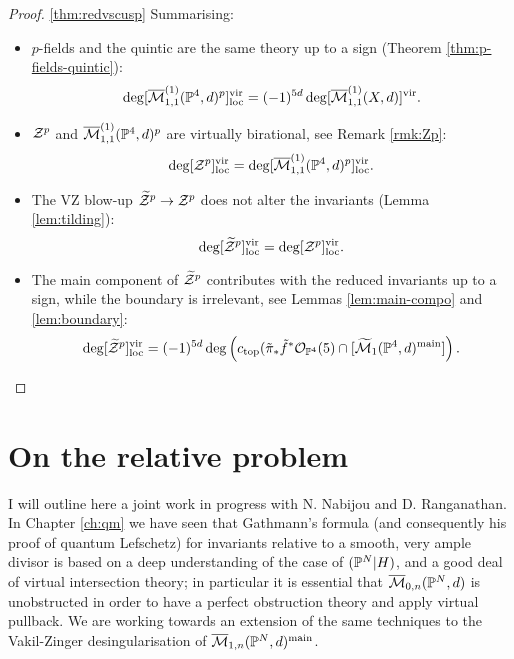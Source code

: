 \begin{proof}\ref{thm:redvscusp}
Summarising:
\begin{itemize}[leftmargin=.5cm]
\item $p$-fields and the quintic are the same theory up to a sign (Theorem \ref{thm:p-fields-quintic}): \[\deg[\overline{\mathcal M}^{(1)}_{1,1}(\mathbb P^4,d)^p]^{\rm{vir}}_{\rm{loc}}= (-1)^{5d}\deg[\overline{\mathcal M}^{(1)}_{1,1}(X,d)]^{\rm{vir}}.\]
\item $\mathcal Z^p$ and $\overline{\mathcal M}^{(1)}_{1,1}(\mathbb P^4,d)^p$ are virtually birational, see Remark \ref{rmk:Zp}:
\[\deg[\mathcal Z^p]^{\mathrm{vir}}_{\mathrm{loc}}=\deg[\overline{\mathcal M}^{(1)}_{1,1}(\mathbb P^4,d)^p]^{\mathrm{vir}}_{\mathrm{loc}}.\]
\item The VZ blow-up $\widetilde{\mathcal Z}^p\rightarrow \mathcal Z^p$ does not alter the invariants (Lemma \ref{lem:tilding}): \[\deg[\widetilde{\mathcal Z}^p]^{\mathrm{vir}}_{\mathrm{loc}}=\deg[\mathcal Z^p]^{\mathrm{vir}}_{\mathrm{loc}}.\]
\item The main component of $\widetilde{\mathcal Z}^p$ contributes with the reduced invariants up to a sign, while the boundary is irrelevant, see Lemmas \ref{lem:main-compo} and \ref{lem:boundary}:
\[\deg[\widetilde{\mathcal Z}^p]^{\mathrm{vir}}_{\mathrm{loc}}=(-1)^{5d}\deg\left(c_{\rm{top}}(\tilde\pi_*\tilde f^*\mathcal{O}_{\mathbb P^4}(5)\cap[\widetilde{\mathcal M}_1(\mathbb P^4,d)^{\rm{main}}]\right).\]
\end{itemize}


\end{proof}
\section{On the relative problem}\label{sec:relativeone}
I will outline here a joint work in progress with N. Nabijou and D. Ranganathan. In Chapter \ref{ch:qm} we have seen that Gathmann's formula (and consequently his proof of quantum Lefschetz) for invariants relative to a smooth, very ample divisor is based on a deep understanding of the case of $(\mathbb P^N|H)$, and a good deal of virtual intersection theory; in particular it is essential that $\overline{\mathcal{M}}_{0,n}(\mathbb P^N,d)$ is unobstructed in order to have a perfect obstruction theory and apply virtual pullback. We are working towards an extension of the same techniques to the Vakil-Zinger desingularisation of $\overline{\mathcal{M}}_{1,n}(\mathbb P^N,d)^{\rm{main}}$.
